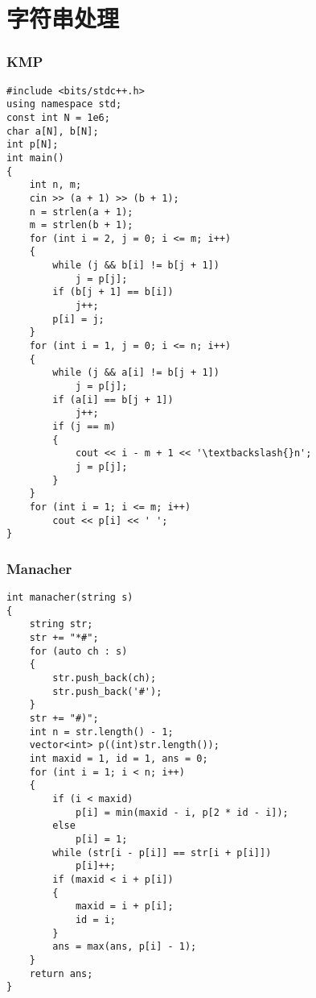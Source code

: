\documentclass{ctexbook}  %
\begin{document}
\chapter{字符串处理}
\subsection{KMP}
\lstset{basicstyle=	tfamily}
\begin{Verbatim}[fontsize=\small]
#include <bits/stdc++.h>
using namespace std;
const int N = 1e6;
char a[N], b[N];
int p[N];
int main()
{
    int n, m;
    cin >> (a + 1) >> (b + 1);
    n = strlen(a + 1);
    m = strlen(b + 1);
    for (int i = 2, j = 0; i <= m; i++)
    {
        while (j && b[i] != b[j + 1])
            j = p[j];
        if (b[j + 1] == b[i])
            j++;
        p[i] = j;
    }
    for (int i = 1, j = 0; i <= n; i++)
    {
        while (j && a[i] != b[j + 1])
            j = p[j];
        if (a[i] == b[j + 1])
            j++;
        if (j == m)
        {
            cout << i - m + 1 << '\textbackslash{}n';
            j = p[j];
        }
    }
    for (int i = 1; i <= m; i++)
        cout << p[i] << ' ';
}
\end{Verbatim}

\subsection{Manacher}
\lstset{basicstyle=	tfamily}
\begin{Verbatim}[fontsize=\small]
int manacher(string s)
{
    string str;
    str += "*#";
    for (auto ch : s)
    {
        str.push_back(ch);
        str.push_back('#');
    }
    str += "#)";
    int n = str.length() - 1;
    vector<int> p((int)str.length());
    int maxid = 1, id = 1, ans = 0;
    for (int i = 1; i < n; i++)
    {
        if (i < maxid)
            p[i] = min(maxid - i, p[2 * id - i]);
        else
            p[i] = 1;
        while (str[i - p[i]] == str[i + p[i]])
            p[i]++;
        if (maxid < i + p[i])
        {
            maxid = i + p[i];
            id = i;
        }
        ans = max(ans, p[i] - 1);
    }
    return ans;
}
\end{Verbatim}
\end{document}
